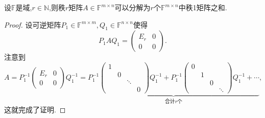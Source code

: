 \documentclass[../../main.tex]{subfiles}%
\begin{document}
\begin{theorem}[秩一分解]\label{theorem:秩一分解}
设\( \mathbb{F} \)是域,\( r \in \mathbb{N} \),则秩\( r \)矩阵\( A \in \mathbb{F}^{m \times n} \)可以分解为\( r \)个\( \mathbb{F}^{m \times n} \)中秩1矩阵之和.
\end{theorem}
\begin{proof}
设可逆矩阵\( P_1 \in \mathbb{F}^{m \times m}, Q_1 \in \mathbb{F}^{n \times n} \)使得
\[
P_1 A Q_1 = \begin{pmatrix} E_r & 0 \\ 0 & 0 \end{pmatrix}.
\]
注意到
\[
A = P_1^{-1} \begin{pmatrix} E_r & 0 \\ 0 & 0 \end{pmatrix} Q_1^{-1} = \underbrace{P_1^{-1} \begin{pmatrix} 1 & & \\ & 0 & \\ & & \ddots \\ & & & 0 \end{pmatrix} Q_1^{-1} + P_1^{-1} \begin{pmatrix} 0 & & \\ & 1 & \\ & & 0 \\ & & & \ddots \end{pmatrix} Q_1^{-1} + \cdots}_{\text{合计} r \text{个}},
\]
这就完成了证明.
\end{proof}
\end{document}
